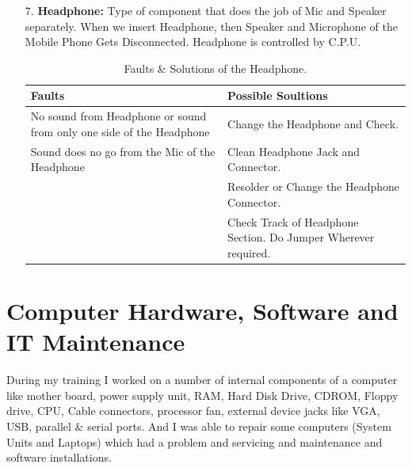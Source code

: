 \begin{itemize}
\item[7.] \textbf{Headphone:} Type of component that does the job of Mic and Speaker separately.
When we insert Headphone, then Speaker and Microphone of the Mobile Phone Gets Disconnected. Headphone is controlled by C.P.U.
\begin{table}[!ht]
\centering
\begin{tabular}{|p{2.5in}|p{3.5in}|}
\hline
\textbf{Faults} & \textbf{Possible Soultions} \\ \hline
No sound from Headphone or sound from only one side of the Headphone & Change the Headphone and Check.\\ 
Sound does no go from the Mic of the Headphone &  Clean Headphone Jack and Connector.\\ 
                & Resolder or Change the Headphone Connector.\\ 
                & Check Track of Headphone Section. Do Jumper Wherever required. \\
\hline
\end{tabular}
\caption{Faults \& Solutions of the Headphone.}
\end{table}

\end{itemize}

\section{Computer Hardware, Software and IT Maintenance}
During my training​ I worked on a number of internal components of a computer like ​mother board, power supply unit, RAM, Hard Disk Drive, CDROM, Floppy drive, CPU, Cable connectors, processor fan, external device jacks like VGA, USB, parallel \& serial ports.​ And I was able to repair some computers (System Units and Laptops) which had a problem and servicing and maintenance and software installations.
